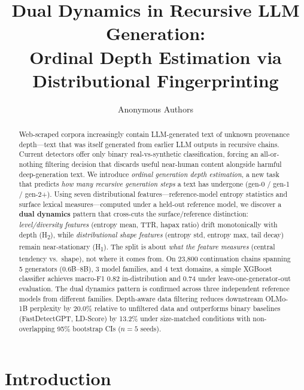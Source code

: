\documentclass[letterpaper]{article}
\title{Dual Dynamics in Recursive LLM Generation:\\Ordinal Depth Estimation via Distributional Fingerprinting}
\author{
Anonymous Authors
}
\date{}
\newcommand{\htwo}{H\textsubscript{2}}
\newcommand{\hone}{H\textsubscript{1}}
\begin{document}
\maketitle

\begin{abstract}
Web-scraped corpora increasingly contain LLM-generated text of unknown provenance depth---text that was itself generated from earlier LLM outputs in recursive chains.
Current detectors offer only binary real-vs-synthetic classification, forcing an all-or-nothing filtering decision that discards useful near-human content alongside harmful deep-generation text.
We introduce \emph{ordinal generation depth estimation}, a new task that predicts \emph{how many recursive generation steps} a text has undergone (gen-0 / gen-1 / gen-2{+}).
Using seven distributional features---reference-model entropy statistics and surface lexical measures---computed under a held-out reference model, we discover a \textbf{dual dynamics} pattern that cross-cuts the surface/reference distinction: \emph{level/diversity features} (entropy mean, TTR, hapax ratio) drift monotonically with depth (\htwo), while \emph{distributional shape features} (entropy std, entropy max, tail decay) remain near-stationary (\hone).
The split is about \emph{what the feature measures} (central tendency vs.\ shape), not where it comes from.
On 23{,}800 continuation chains spanning 5 generators (0.6B--8B), 3 model families, and 4 text domains, a simple XGBoost classifier achieves macro-F1 0.82 in-distribution and 0.74 under leave-one-generator-out evaluation.
The dual dynamics pattern is confirmed across three independent reference models from different families.
Depth-aware data filtering reduces downstream OLMo-1B perplexity by 20.0\% relative to unfiltered data and outperforms binary baselines (FastDetectGPT, LD-Score) by 13.2\% under size-matched conditions with non-overlapping 95\% bootstrap CIs ($n{=}5$ seeds).
\end{abstract}

\section{Introduction}
\end{document}
